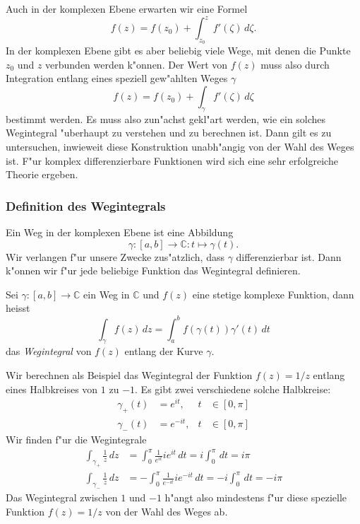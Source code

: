 Auch in der komplexen Ebene erwarten wir eine Formel
\[
f(z) = f(z_0) + \int_{z_0}^z f'(\zeta)\,d\zeta.
\]
In der komplexen Ebene gibt es aber beliebig viele Wege, mit denen die
Punkte $z_0$ und $z$ verbunden werden k"onnen. 
Der Wert von $f(z)$ muss also durch Integration entlang eines speziell
gew"ahlten Weges $\gamma$
\[
f(z) = f(z_0) + \int_{\gamma} f'(\zeta)\,d\zeta
\]
bestimmt werden.
Es muss also zun"achst gekl"art werden, wie ein solches Wegintegral
"uberhaupt zu verstehen und zu berechnen ist.
Dann gilt es zu untersuchen, inwieweit diese Konstruktion unabh"angig
von der Wahl des Weges ist.
F"ur komplex differenzierbare Funktionen wird sich eine sehr erfolgreiche
Theorie ergeben.

%
%
\subsubsection{Definition des Wegintegrals}
Ein Weg in der komplexen Ebene ist eine Abbildung 
\[
\gamma\colon [a,b]\to\mathbb C: t\mapsto \gamma(t).
\]
Wir verlangen f"ur unsere Zwecke zus"atzlich, dass $\gamma$ differenzierbar
ist.
Dann k"onnen wir f"ur jede beliebige Funktion das Wegintegral definieren.

\begin{definition}
Sei $\gamma\colon[a,b]\to\mathbb C$ ein Weg in $\mathbb C$ und $f(z)$
eine stetige komplexe Funktion, dann heisst
\[
\int_{\gamma} f(z)\,dz = \int_a^bf(\gamma(t)) \gamma'(t)\,dt
\]
das {\em Wegintegral} von $f(z)$ entlang der Kurve $\gamma$.
\end{definition}

\begin{beispiel}
Wir berechnen als Beispiel das Wegintegral der Funktion $f(z)=1/z$ entlang
eines Halbkreises von $1$ zu $-1$. 
Es gibt zwei verschiedene solche Halbkreise:
\begin{equation*}
\begin{aligned}
\gamma_+(t)&=e^{it},&t&\in[0,\pi]
\\
\gamma_-(t)&=e^{-it},&t&\in[0,\pi]
\end{aligned}
\end{equation*}
Wir finden f"ur die Wegintegrale
\begin{align*}
\int_{\gamma_+}\frac1z\,dz
&=
\int_0^\pi \frac1{e^{it}}ie^{it}\,dt=i\int_0^\pi\,dt=i\pi
\\
\int_{\gamma_-}\frac1z\,dz
&=
-\int_0^\pi \frac1{e^{-it}}ie^{-it}\,dt=-i\int_0^\pi\,dt=-i\pi
\end{align*}
Das Wegintegral zwischen $1$ und $-1$ h"angt also mindestens f"ur diese
spezielle Funktion $f(z)=1/z$ von der Wahl des Weges ab.
\end{beispiel}

